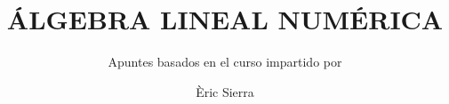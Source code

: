 \documentclass[catalan]{../notes}
\title{ÁLGEBRA LINEAL NUMÉRICA}
\author{Èric Sierra}\singleauthor
\subtitle{Apuntes basados en el curso impartido por }%
\begin{document}
\makecover



\printindex
\end{document}
